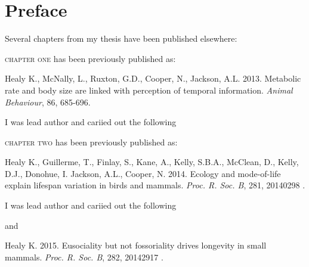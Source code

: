 \chapter*{Preface} %

Several chapters from my thesis have been published elsewhere:

\textsc{chapter one} has been previously published as:
%
\begin{previouspaper}
  Healy K., McNally, L., Ruxton, G.D., Cooper, N., Jackson, A.L. 2013. Metabolic rate and body size are linked with perception of temporal information. \textit{Animal Behaviour}, 86, 685-696.
\end{previouspaper}

I was lead author and cariied out the following 


{}
\textsc{chapter two} has been previously published as:
%
\begin{previouspaper}
  Healy K., Guillerme, T., Finlay, S., Kane, A., Kelly, S.B.A., McClean, D., Kelly, D.J., Donohue, I. Jackson, A.L., Cooper, N. 2014. Ecology and mode-of-life explain lifespan variation in birds and mammals. \textit{Proc. R. Soc. B}, 281, 20140298 .
\end{previouspaper}

I was lead author and cariied out the following 

and 

\begin{previouspaper}
  Healy K. 2015. Eusociality but not fossoriality drives longevity in small mammals. \textit{Proc. R. Soc. B}, 282, 20142917 .
\end{previouspaper}

